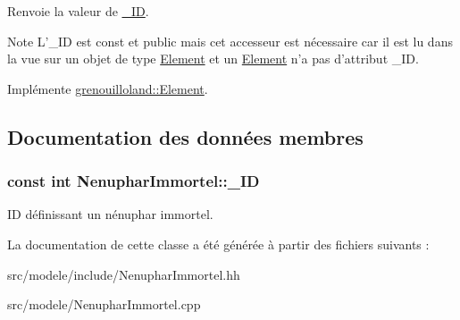 \begin{DoxyReturn}{Renvoie}
la valeur de \hyperlink{classgrenouilloland_1_1NenupharImmortel_a1a37a7af6e1296d47556752041b2fe18}{\-\_\-\-I\-D}.
\end{DoxyReturn}
\begin{DoxyNote}{Note}
L'\-\_\-\-I\-D est const et public mais cet accesseur est nécessaire car il est lu dans la vue sur un objet de type \hyperlink{classgrenouilloland_1_1Element}{Element} et un \hyperlink{classgrenouilloland_1_1Element}{Element} n'a pas d'attribut \-\_\-\-I\-D. 
\end{DoxyNote}


Implémente \hyperlink{classgrenouilloland_1_1Element_aa05b1a2f2e0e8eb0e5ebf942b8934388}{grenouilloland\-::\-Element}.



\subsection{Documentation des données membres}
\hypertarget{classgrenouilloland_1_1NenupharImmortel_a1a37a7af6e1296d47556752041b2fe18}{
\subsubsection[{\-\_\-\-I\-D}]{\setlength{\rightskip}{0pt plus 5cm}const int Nenuphar\-Immortel\-::\-\_\-\-I\-D\hspace{0.3cm}{\ttfamily [static]}}}\label{classgrenouilloland_1_1NenupharImmortel_a1a37a7af6e1296d47556752041b2fe18}
I\-D définissant un nénuphar immortel. 

La documentation de cette classe a été générée à partir des fichiers suivants \-:\begin{DoxyCompactItemize}
\item 
src/modele/include/Nenuphar\-Immortel.\-hh\item 
src/modele/Nenuphar\-Immortel.\-cpp\end{DoxyCompactItemize}
